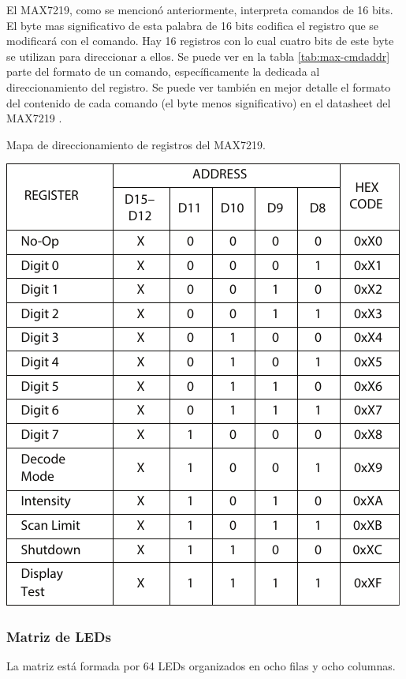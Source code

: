 El MAX7219, como se mencionó anteriormente, interpreta comandos de 16 bits. El byte mas significativo de esta palabra de 16 bits codifica el registro que se modificará con el comando. Hay 16 registros con lo cual cuatro bits de este byte se utilizan para direccionar a ellos. Se puede ver en la tabla \ref{tab:max-cmdaddr} parte del formato de un comando, específicamente la dedicada al direccionamiento del registro. Se puede ver también en mejor detalle el formato del contenido de cada comando (el byte menos significativo) en el datasheet del MAX7219 \cite{MAX7219}.
\begin{table}[ht]
	\centering
	\caption{Mapa de direccionamiento de registros del MAX7219.}
	\vspace{0.2cm}
	\includegraphics[scale=1]{imagenes/max-cmdaddr.pdf}
	\label{tab:max-cmdaddr}
\end{table}

\subsubsection{Matriz de LEDs} \label{sec:matriz-leds}
La matriz está formada por 64 LEDs organizados en ocho filas y ocho columnas.

